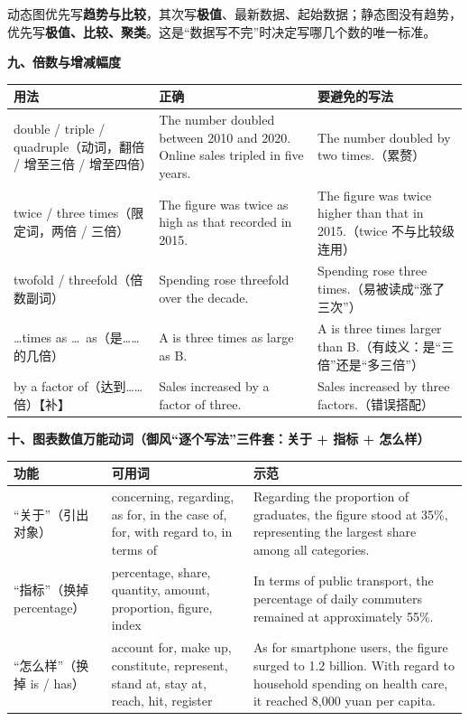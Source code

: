 \documentclass[11pt,a4paper]{ctexart}
\newcommand{\tip}[1]{\par\addvspace{3pt}\noindent{\bfseries【提示】}#1\par\addvspace{3pt}}
\begin{document}
\tip{动态图优先写\textbf{趋势与比较}，其次写\textbf{极值}、最新数据、起始数据；静态图没有趋势，优先写\textbf{极值、比较、聚类}。这是“数据写不完”时决定写哪几个数的唯一标准。}

\par\addvspace{5pt}\noindent\textbf{九、倍数与增减幅度}\par\addvspace{2pt}
\begin{longtable}{L{3.6cm}L{6.8cm}L{5.3cm}}
\toprule
\textbf{用法} & \textbf{正确} & \textbf{要避免的写法} \\
\midrule
\endhead
double / triple / quadruple（动词，翻倍 / 增至三倍 / 增至四倍） & The number doubled between 2010 and 2020. Online sales tripled in five years. & The number doubled by two times.（累赘） \\
twice / three times（限定词，两倍 / 三倍） & The figure was twice as high as that recorded in 2015. & The figure was twice higher than that in 2015.（twice 不与比较级连用） \\
twofold / threefold（倍数副词） & Spending rose threefold over the decade. & Spending rose three times.（易被读成“涨了三次”） \\
\ldots times as \ldots\ as（是……的几倍） & A is three times as large as B. & A is three times larger than B.（有歧义：是“三倍”还是“多三倍”） \\
by a factor of（达到……倍）【补】 & Sales increased by a factor of three. & Sales increased by three factors.（错误搭配） \\
\bottomrule
\end{longtable}

\par\addvspace{5pt}\noindent\textbf{十、图表数值万能动词（御风“逐个写法”三件套：关于 + 指标 + 怎么样）}\par\addvspace{2pt}
\begin{longtable}{L{3.2cm}L{6.6cm}L{5.9cm}}
\toprule
\textbf{功能} & \textbf{可用词} & \textbf{示范} \\
\midrule
\endhead
“关于”（引出对象） & concerning, regarding, as for, in the case of, for, with regard to, in terms of & Regarding the proportion of graduates, the figure stood at 35\%, representing the largest share among all categories. \\
“指标”（换掉 percentage） & percentage, share, quantity, amount, proportion, figure, index & In terms of public transport, the percentage of daily commuters remained at approximately 55\%. \\
“怎么样”（换掉 is / has） & account for, make up, constitute, represent, stand at, stay at, reach, hit, register & As for smartphone users, the figure surged to 1.2 billion. With regard to household spending on health care, it reached 8,000 yuan per capita. \\
\bottomrule
\end{longtable}
\end{document}
